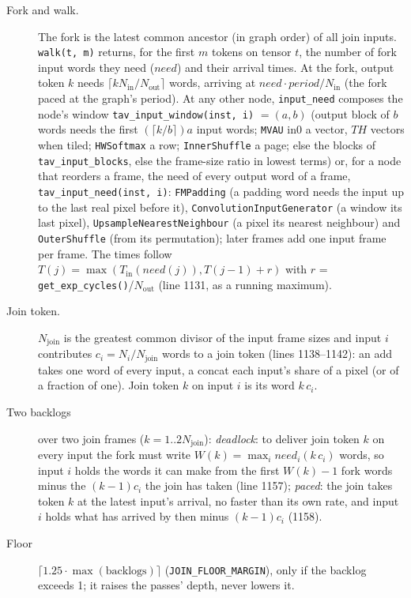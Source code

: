 \documentclass[10pt,a4paper]{article}
\newcommand{\code}[1]{\texttt{#1}}
\begin{document}
\begin{description}
\item[Fork and walk.] The fork is the latest common ancestor (in graph order) of all
  join inputs. \code{walk(t, m)} returns, for the first $m$ tokens on tensor $t$, the
  number of fork input words they need ($\mathit{need}$) and their arrival times.
  At the fork, output token $k$ needs $\lceil kN_{\mathrm{in}}/N_{\mathrm{out}}\rceil$ words,
  arriving at $\mathit{need}\cdot\mathit{period}/N_{\mathrm{in}}$ (the fork paced at the graph's
  period). At any other node, \code{input\_need} composes the node's window
  \code{tav\_input\_window(inst, i)} $=(a,b)$ (output block of $b$ words needs the first
  $(\lceil k/b\rceil) a$ input words; \code{MVAU} in0 a vector, $TH$ vectors when tiled;
  \code{HWSoftmax} a row; \code{InnerShuffle} a page; else the blocks of
  \code{tav\_input\_blocks}, else the frame-size ratio in lowest terms) or, for a node
  that reorders a frame, the need of every output word of a frame,
  \code{tav\_input\_need(inst, i)}: \code{FMPadding} (a padding word needs the input up to
  the last real pixel before it), \code{ConvolutionInputGenerator} (a window its last
  pixel), \code{UpsampleNearestNeighbour} (a pixel its nearest neighbour) and
  \code{OuterShuffle} (from its permutation); later frames add one input frame per
  frame. The times follow $T(j)=\max(T_{\mathrm{in}}(\mathit{need}(j)),T(j-1)+r)$
  with $r$ = \code{get\_exp\_cycles()}/$N_{\mathrm{out}}$ (line 1131, as a running maximum).
\item[Join token.] $N_{\mathrm{join}}$ is the greatest common divisor of the input
  frame sizes and input $i$ contributes $c_i=N_i/N_{\mathrm{join}}$ words to a join token
  (lines 1138--1142): an add takes one word of every input, a concat each input's share
  of a pixel (or of a fraction of one). Join token $k$ on input $i$ is its word $k\,c_i$.
\item[Two backlogs] over two join frames ($k=1..2N_{\mathrm{join}}$):
  \emph{deadlock}: to deliver join token $k$ on every input the fork must write
  $W(k)=\max_i \mathit{need}_i(k\,c_i)$ words, so input $i$ holds the words it can make from the
  first $W(k)-1$ fork words minus the $(k-1)c_i$ the join has taken (line 1157);
  \emph{paced}: the join takes token $k$ at the latest input's arrival, no faster
  than its own rate, and input $i$ holds what has arrived by then minus $(k-1)c_i$ (1158).
\item[Floor] $\lceil 1.25\cdot\max(\text{backlogs})\rceil$ (\code{JOIN\_FLOOR\_MARGIN}),
  only if the backlog exceeds 1; it raises the passes' depth, never lowers it.
\end{description}
\end{document}
